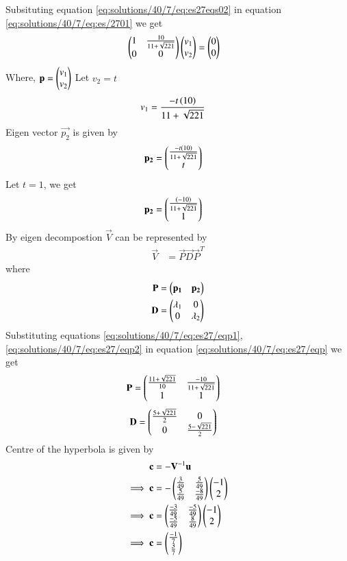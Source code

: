 Subsituting equation \ref{eq:solutions/40/7/eq:es27eqs02} in equation \ref{eq:solutions/40/7/eq:es/2701} we get 
\begin{align}
    &\begin{pmatrix}1 & \frac{10}{11+\sqrt{221}} \\0 & 0\end{pmatrix}\begin{pmatrix}v_1 \\ v_2\end{pmatrix}=\begin{pmatrix}0 \\ 0\end{pmatrix}
\end{align}
Where, $\mathbf{p}=\begin{pmatrix}v_1\\v_2\end{pmatrix}$
Let $v_2=t$
\begin{align}
    v_1&=\frac{-t\left(10\right)}{11+\sqrt{221}}
\end{align}
Eigen vector $\vec{p_2}$ is given by
\begin{align}
        \mathbf{p_2}&=\begin{pmatrix}\frac{-t\left(10\right)}{11+\sqrt{221}} \\ t\end{pmatrix}
\end{align}
Let $t=1$, we get 
\begin{align}
    \mathbf{p_2}&=\begin{pmatrix}\frac{\left(-10\right)}{11+\sqrt{221}} \\1 \end{pmatrix}\label{eq:solutions/40/7/eq:es27/eqp2}
\end{align}
By eigen decompostion $\vec{V}$ can be represented by
\begin{align}
    \vec{V}&=\vec{P}\vec{D}\vec{P}^T\label{eq:solutions/40/7/eq:es27/eqsubs}
\end{align}
where 
\begin{align}
        \mathbf{P}&=\begin{pmatrix}\mathbf{p_1} & \mathbf{p_2}\end{pmatrix}\label{eq:solutions/40/7/eq:es27/eqp}\\
    \mathbf{D}&=\begin{pmatrix}\lambda_1 & 0 \\0 & \lambda_2\end{pmatrix}\label{eq:solutions/40/7/eq:es27/eqD}
\end{align}
Substituting equations \ref{eq:solutions/40/7/eq:es27/eqp1}, \ref{eq:solutions/40/7/eq:es27/eqp2} in equation \ref{eq:solutions/40/7/eq:es27/eqp} we get 
\begin{align}
    \mathbf{P}&=\begin{pmatrix}\frac{11+\sqrt{221}}{10} & \frac{-10}{11+\sqrt{221}} \\1 & 1\end{pmatrix}\label{eq:solutions/40/7/eq:es27/eqP}
\end{align}
\begin{align}
       \mathbf{D}&=\begin{pmatrix}\frac{5+\sqrt{221}}{2} & 0\\0 & \frac{5-\sqrt{221}}{2}\end{pmatrix}\label{eq:solutions/40/7/eq:es27/eqDD}
\end{align}
Centre of the hyperbola is given by 
\begin{align}
    \mathbf{c}&=-\mathbf{V}^{-1}\mathbf{u}\\
    \implies\mathbf{c}&=-\begin{pmatrix}\frac{3}{49}&\frac{5}{49}\\\frac{5}{49}&\frac{-8}{49}\end{pmatrix}\begin{pmatrix}-1 \\ 2\end{pmatrix}\\
    \implies\mathbf{c}&=\begin{pmatrix}\frac{-3}{49}&\frac{-5}{49}\\\frac{-5}{49}&\frac{8}{49}\end{pmatrix}\begin{pmatrix}-1 \\ 2\end{pmatrix}\\
    \implies\mathbf{c}&=\begin{pmatrix}\frac{-1}{7}\\\frac{3}{7}\end{pmatrix}
\end{align}
